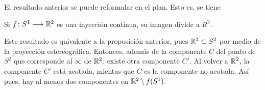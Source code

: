 \documentclass[GTS.tex]{subfiles}
\begin{document}
El resultado anterior se puede reformular en el plan. Esto es, se tiene

\begin{prop} 
Si $f\colon{S^1}\longrightarrow{\mathbb{R}^2}$ es una inyección continua, su imagen divide a $R^2$.
\end{prop}

Este resultado es quivalente a la proposición anterior, pues $\mathbb{R}^2\subset S^2$ por medio de la proyección estereográfica. Entonces, además de la componente $C$ del punto de $S^2$ que corresponde al $\infty$ de $\mathbb{R}^2$, existe otra componente $C'$. Al volver a $\mathbb{R}^2$, la componente $C'$ está acotada, mientas que $C$ es la componente no acotada. Así pues, hay al menos dos componentes en $\mathbb{R}^2\setminus f(S^1)$.
\end{document}
